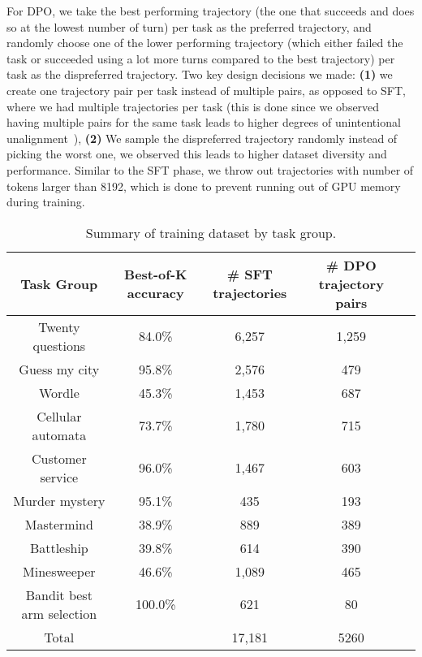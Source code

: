 For DPO, we take the best performing trajectory (the one that succeeds and does so at the lowest number of turn) per task as the preferred trajectory, and randomly choose one of the lower performing trajectory (which either failed the task or succeeded using a lot more turns compared to the best trajectory) per task as the dispreferred trajectory. Two key design decisions we made: \textbf{(1)} we create one trajectory pair per task instead of multiple pairs, as opposed to SFT, where we had multiple trajectories per task (this is done since we observed having multiple pairs for the same task leads to higher degrees of unintentional unalignment~\citet{razin2024unintentionalunalignmentlikelihooddisplacement}), \textbf{(2)} We sample the dispreferred trajectory randomly instead of picking the worst one, we observed this leads to higher dataset diversity and performance. Similar to the SFT phase, we throw out trajectories with number of tokens larger than 8192, which is done to prevent running out of GPU memory during training.

\begin{table*}[h]
    \caption{Summary of training dataset by task group. }
    \label{tab:train_dataset_summary}
    \vspace{0.3cm}
    \centering
        \begin{tabular}{c|c c c c}
        \toprule
            Task Group & Best-of-K accuracy & \# SFT trajectories & \# DPO trajectory pairs \\
            \midrule
            Twenty questions & 84.0\% & 6,257 & 1,259 \\
             Guess my city & 95.8\% & 2,576 & 479 \\
             Wordle & 45.3\% & 1,453 & 687 \\
             Cellular automata & 73.7\% & 1,780 & 715 \\
             Customer service & 96.0\% & 1,467 & 603 \\
             Murder mystery & 95.1\% & 435 & 193 \\
             Mastermind & 38.9\% & 889 & 389  \\
             Battleship & 39.8\% & 614 & 390 \\
             Minesweeper & 46.6\% & 1,089 & 465  \\
             Bandit best arm selection & 100.0\% & 621 & 80 \\
            \midrule
            Total & & 17,181 & 5260 \\
            \bottomrule
        \end{tabular}
    \vspace{-0.3cm}
\end{table*}

